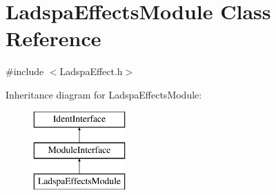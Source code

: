 \hypertarget{class_ladspa_effects_module}{}\section{Ladspa\+Effects\+Module Class Reference}
\label{class_ladspa_effects_module}


{\ttfamily \#include $<$Ladspa\+Effect.\+h$>$}

Inheritance diagram for Ladspa\+Effects\+Module\+:\begin{figure}[H]
\begin{center}
\leavevmode
\includegraphics[height=3.000000cm]{class_ladspa_effects_module}
\end{center}
\end{figure}
